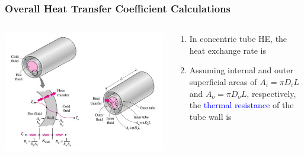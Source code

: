 \documentclass[10pt,compress]{beamer}
\newcommand{\frc}{\displaystyle\frac}
\newcommand{\blue}{\textcolor{blue}}
\begin{document}
\begin{frame}
  \frametitle{Overall Heat Transfer Coefficient Calculations}
    \begin{columns}
       \begin{column}[l]{0.4\linewidth}
         \includegraphics[width=1.1\columnwidth,clip]{./Pics/HeatExchangers_Flow}
       \end{column}
       \begin{column}[l]{0.6\linewidth}
         \begin{enumerate}\scriptsize
            \item<1-> In concentric tube HE, the heat exchange rate is
            \item<2-> Assuming internal and outer superficial areas of $A_{i}=\pi D_{i}L$ and $A_{o}=\pi D_{o}L$, respectively, the \blue{thermal resistance} of the tube wall is
               \visible<2->{\begin{displaymath}
                  R_{\text{wall}} = \frc{\ln{D_{o}/D_{i}}}{2\pi \kappa L}
               \end{displaymath}}   
         \end{enumerate}
       \end{column}      
    \end{columns}
\end{frame}
\end{document}
